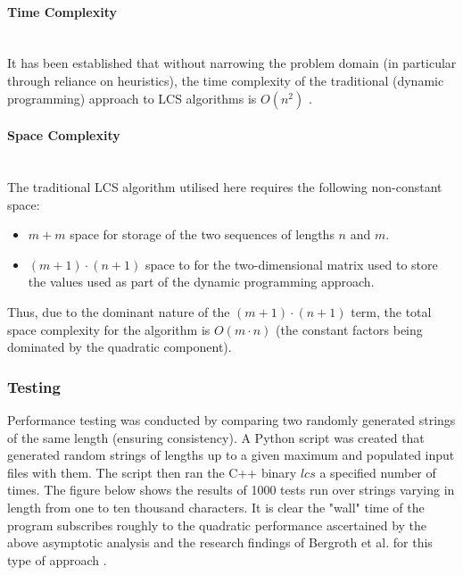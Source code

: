 \paragraph{Time Complexity\\ \\} 


It has been established that without narrowing the problem domain (in particular through reliance on heuristics), the time complexity of the traditional (dynamic programming) approach to LCS algorithms is $O(n^2)$ \cite{hunt}.

\paragraph{Space Complexity\\ \\} 


The traditional LCS algorithm utilised here requires the following non-constant space:

\vspace{-1em}
\begin{itemize}
    \item $m + m$ space for storage of the two sequences of lengths $n$ and $m$.
    \item $(m+1) \cdot (n+1)$ space to for the two-dimensional matrix used to store the values used as part of the dynamic programming approach.
\end{itemize}

 Thus, due to the dominant nature of the $(m+1) \cdot (n+1)$ term, the total space complexity for the algorithm is $O(m \cdot n)$ (the constant factors being dominated by the quadratic component).

\subsubsection{Testing}

Performance testing was conducted by comparing two randomly generated strings of the same length (ensuring consistency). A Python script was created that generated random strings of lengths up to a given maximum and populated input files with them. The script then ran the C++ binary $lcs$ a specified number of times. The figure below shows the results of 1000 tests run over strings varying in length from one to ten thousand characters. It is clear the "wall" time of the program subscribes roughly to the quadratic performance ascertained by the above asymptotic analysis and the research findings of Bergroth et al. for this type of approach \cite{survey}.

